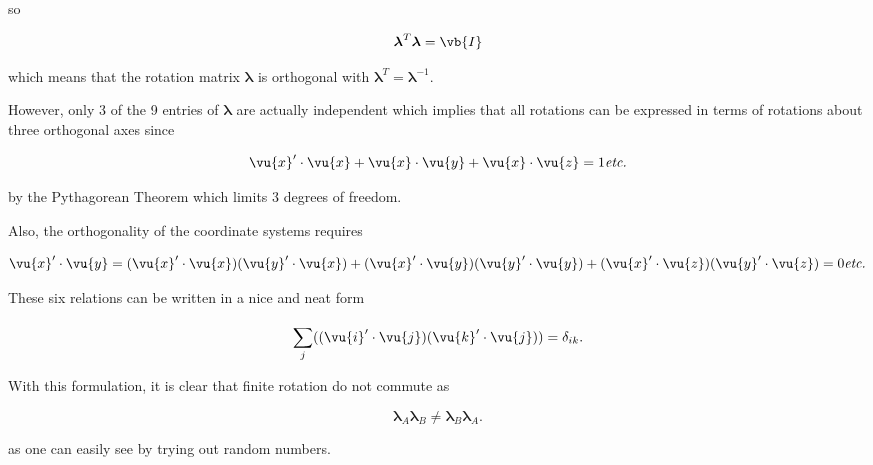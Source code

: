 \documentclass[a4paper,12pt]{report}
\begin{document}
so

\begin{equation}
	\boldsymbol{\lambda } ^{T} \boldsymbol{\lambda } = \vb{I} 
\end{equation}

which means that the rotation matrix \(\boldsymbol{\lambda } \) is orthogonal with \(\boldsymbol{\lambda } ^{T} = \boldsymbol{\lambda } ^{-1} \).  

However, only 3 of the 9 entries of \(\boldsymbol{\lambda } \) are actually independent which implies that all rotations can be expressed in terms of rotations about three orthogonal axes since 

\begin{equation}
	\vu{x} ' \cdot \vu{x} + \vu{x}  \cdot \vu{y} + \vu{x}  \cdot \vu{z} = 1 \textit{etc.} 
\end{equation}

by the Pythagorean Theorem which limits 3 degrees of freedom. 

Also, the orthogonality of the coordinate systems requires

\begin{equation}
	\vu{x} ' \cdot \vu{y} = (\vu{x} ' \cdot \vu{x} )(\vu{y} '\cdot \vu{x} ) + (\vu{x} ' \cdot \vu{y} )(\vu{y} '\cdot \vu{y} ) + (\vu{x} '\cdot \vu{z} )(\vu{y} '\cdot \vu{z} ) = 0 \textit{etc.}
\end{equation}

These six relations can be written in a nice and neat form

\begin{equation}
	\sum_{j}^{} ((\vu{i} '\cdot \vu{j})(\vu{k} '\cdot \vu{j} )) = \delta _{ik} . 
\end{equation}

With this formulation, it is clear that finite rotation do not commute as

\begin{equation}
	\boldsymbol{\lambda } _{A} \boldsymbol{\lambda } _{B} \neq \boldsymbol{\lambda } _{B} \boldsymbol{\lambda } _{A} . 
\end{equation}

as one can easily see by trying out random numbers.
\end{document}
